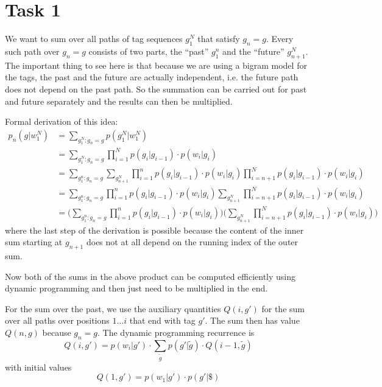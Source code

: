 \documentclass[%
   11pt,              %
   ngerman,           %
   a4paper,           %
   DIV11,             %
]{scrartcl}%
\begin{document}
\section*{Task 1}
We want to sum over all paths of tag sequences $g_1^N$ that satisfy $g_n = g$. Every such path over $g_n = g$ consists of two parts, the ``past'' $g_1^{n}$ and the ``future'' $g_{n+1}^N$. The important thing to see here is that because we are using a bigram model for the tags, the past and the future are actually independent, i.e. the future path does not depend on the past path. So the summation can be carried out for past and future separately and the results can then be multiplied. \par
Formal derivation of this idea:
\begin{align*}
	p_n(g|w_1^N) &= \sum_{g_1^N: g_n = g} p(g_1^N|w_1^N) \\
	&= \sum_{g_1^N: g_n = g} \prod_{i=1}^N p(g_i|g_{i-1}) \cdot p(w_i|g_i) \\
	&= \sum_{g_1^{n}: g_n = g} \sum_{g_{n+1}^N} \prod_{i=1}^n p(g_i|g_{i-1}) \cdot p(w_i|g_i) \prod_{i=n+1}^N p(g_i|g_{i-1}) \cdot p(w_i|g_i)\\
	&= \sum_{g_1^{n}: g_n = g} \prod_{i=1}^n p(g_i|g_{i-1}) \cdot p(w_i|g_i) \sum_{g_{n+1}^N} \prod_{i=n+1}^N p(g_i|g_{i-1}) \cdot p(w_i|g_i)\\
	&= \bigg(\sum_{g_1^{n}: g_n = g} \prod_{i=1}^n p(g_i|g_{i-1}) \cdot p(w_i|g_i)\bigg)\bigg( \sum_{g_{n+1}^N} \prod_{i=n+1}^N p(g_i|g_{i-1}) \cdot p(w_i|g_i)\bigg) 
\end{align*}
where the last step of the derivation is possible because the content of the inner sum starting at $g_{n+1}$ does not at all depend on the running index of the outer sum. \par
Now both of the sums in the above product can be computed efficiently using dynamic programming and then just need to be multiplied in the end. \par
For the sum over the past, we use the auxiliary quantities $Q(i,g')$ for the sum over all paths over positions $1\ldots i$ that end with tag $g'$. The sum then has value $Q(n,g)$ because $g_n = g$. The dynamic programming recurrence is
\begin{equation*}
	Q(i,g') = p(w_i|g') \cdot \sum_{\tilde{g}} p(g'|\tilde{g}) \cdot Q(i-1,\tilde{g}) 
\end{equation*}
with initial values
\begin{equation*}
	Q(1,g') = p(w_1|g') \cdot p(g'|\$)
\end{equation*}
\end{document}
